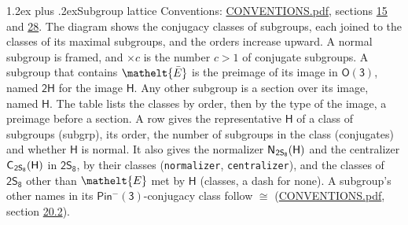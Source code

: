 \documentclass[10pt,a4paper]{article}
\makeatletter
\renewcommand\section{\@startsection{section}{1}{\z@}{-3ex plus -1ex minus -.2ex}%
  {1.2ex plus .2ex}{\normalfont\large\sffamily\bfseries\color{parttitle}}}
\numberwithin{equation}{section}
\newcommand{\eltfont}[1]{{\let\sigma\eltsigma\mathelt{#1}}}
\newcommand{\grp}[1]{\mathsf{#1}}
\newcommand{\cls}[1]{\eltfont{#1}}
\newcommand{\elt}[1]{\eltfont{#1}}
\newcommand{\samecls}{\cong}
\newcommand{\barred}[1]{\bar{#1}}
\newcommand{\hairsp}{\mkern1mu}
\makeatother
\begin{document}
\section{Subgroup lattice}\label{s:subgroups}
Conventions: \href{../../CONVENTIONS.pdf}{CONVENTIONS.pdf}, sections \href{../../../rotation/CONVENTIONS.pdf\#conv.15}{15} and \href{../../CONVENTIONS.pdf\#conv.28}{28}.
The diagram shows the conjugacy classes of subgroups, each joined to the classes of its maximal subgroups, and the orders increase upward. \label{n:index.conjugates.c}A normal subgroup is framed, and ${\times}c$ is the number $c > 1$ of conjugate subgroups. \label{n:group.H}A subgroup that contains $\elt{\barred{E}}$ is the preimage of its image in $\grp{O(3)}$, named $\grp{2H}$ for the image $\grp{H}$. Any other subgroup is a section over its image, named $\grp{H}$. The table lists the classes by order, then by the type of the image, a preimage before a section. \label{n:head.subgroup}\label{n:head.order}\label{n:head.conjugates}\label{n:head.normal}A row gives the representative $\grp{H}$ of a class of subgroups (subgrp), its order, the number of subgroups in the class (conjugates) and whether $\grp{H}$ is normal. \label{n:group.normalizer}\label{n:group.centralizer}\label{n:head.classes}It also gives the normalizer $\grp{N}_{\hairsp \grp{2S_{8}}}(\grp{H})$ and the centralizer $\grp{C}_{\hairsp \grp{2S_{8}}}(\grp{H})$ in $\grp{2S_{8}}$, by their classes (\texttt{normalizer}, \texttt{centralizer}), and the classes of $\grp{2S_{8}}$ other than $\cls{E}$ met by $\grp{H}$ (classes, a dash for none). A subgroup's other names in its \href{Pinminus3.pdf}{$\grp{Pin^{-}(3)}$}-conjugacy class follow $\samecls$ (\href{../../CONVENTIONS.pdf}{CONVENTIONS.pdf}, section \href{../../CONVENTIONS.pdf\#conv.20.2}{20.2}).
\begin{center}
\end{center}
\end{document}

